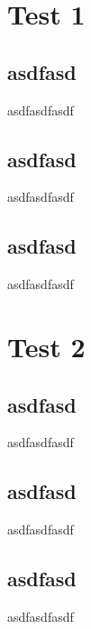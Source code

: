 \documentclass[10pt]{article}
\begin{document}
\begin{multicols}{3}

    \section*{Test 1}
    \subsection*{asdfasd}
    asdfasdfasdf
    \subsection*{asdfasd}
    asdfasdfasdf
    \subsection*{asdfasd}
    asdfasdfasdf

    \section*{Test 2}
    \subsection*{asdfasd}
    asdfasdfasdf
    \subsection*{asdfasd}
    asdfasdfasdf
    \subsection*{asdfasd}
    asdfasdfasdf

\end{multicols}
\end{document}
